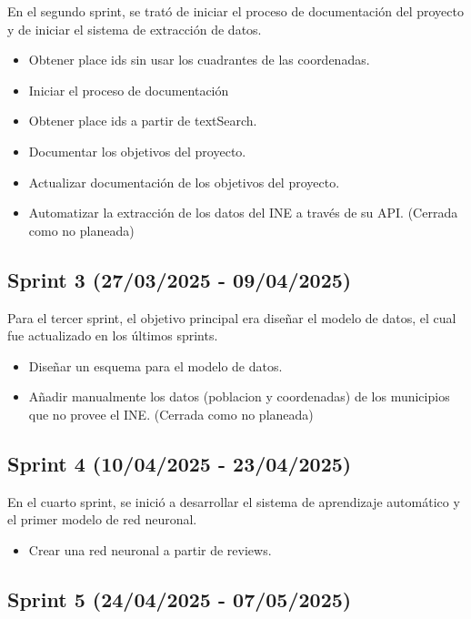 En el segundo sprint, se trató de iniciar el proceso de documentación del proyecto y de iniciar el sistema de extracción de datos.

\begin{itemize}
    \item Obtener place ids sin usar los cuadrantes de las coordenadas.
    \item Iniciar el proceso de documentación
    \item Obtener place ids a partir de textSearch.
    \item Documentar los objetivos del proyecto.
    \item Actualizar documentación de los objetivos del proyecto.
    \item Automatizar la extracción de los datos del INE a través de su API. (Cerrada como no planeada)
\end{itemize}

\subsection{Sprint 3 (27/03/2025 - 09/04/2025)}

Para el tercer sprint, el objetivo principal era diseñar el modelo de datos, el cual fue actualizado en los últimos sprints.

\begin{itemize}
    \item Diseñar un esquema para el modelo de datos.
    \item Añadir manualmente los datos (poblacion y coordenadas) de los municipios que no provee el INE. (Cerrada como no planeada)
\end{itemize}

\subsection{Sprint 4 (10/04/2025 - 23/04/2025)}

En el cuarto sprint, se inició a desarrollar el sistema de aprendizaje automático y el primer modelo de red neuronal.

\begin{itemize}
    \item Crear una red neuronal a partir de reviews.
\end{itemize}

\subsection{Sprint 5 (24/04/2025 - 07/05/2025)}


